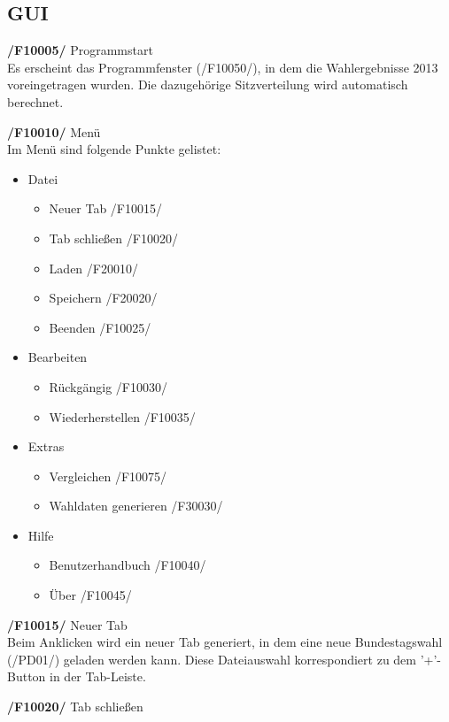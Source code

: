 \documentclass[10pt,a4paper]{article}
\begin{document}
\subsection{GUI}
\begin{description}
	\item \textbf{/F10005/} Programmstart \hfill \\
	Es erscheint das Programmfenster (/F10050/), in dem die Wahlergebnisse 2013 voreingetragen wurden. Die dazugehörige Sitzverteilung wird automatisch berechnet.
	\item \textbf{/F10010/} Menü \hfill \\
	Im Menü sind folgende Punkte gelistet:
		
	\begin{itemize}
		\item Datei
		\begin{itemize}
			\item Neuer Tab /F10015/
			\item Tab schließen /F10020/
			\item Laden /F20010/
			\item Speichern /F20020/
			\item Beenden /F10025/
		\end{itemize}
		\item Bearbeiten
		\begin{itemize}
			\item Rückgängig /F10030/
			\item Wiederherstellen /F10035/
		\end{itemize}
		\item Extras
		\begin{itemize}
			\item Vergleichen /F10075/
			\item Wahldaten generieren /F30030/
		\end{itemize}
		\item Hilfe
		\begin{itemize}
			\item Benutzerhandbuch /F10040/
			\item Über /F10045/
		\end{itemize}	
	\end{itemize}
	\item \textbf{/F10015/} Neuer Tab \hfill \\
	Beim Anklicken wird ein neuer Tab generiert, in dem eine neue Bundestagswahl (/PD01/) geladen werden kann. Diese Dateiauswahl korrespondiert zu dem '+'-Button in der Tab-Leiste.
	\item \textbf{/F10020/} Tab schließen \hfill \\

\end{description}
\end{document}
